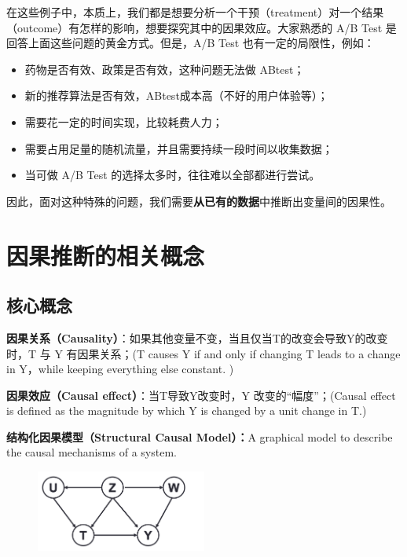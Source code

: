 \documentclass[12pt]{article}
\begin{document}
在这些例子中，本质上，我们都是想要分析一个干预（treatment）对一个结果（outcome）有怎样的影响，想要探究其中的因果效应。大家熟悉的 A/B Test 是回答上面这些问题的黄金方式。但是，A/B Test 也有一定的局限性，例如：
\begin{itemize}
\setlength{\itemsep}{0pt}
\setlength{\parsep}{0pt}
\setlength{\parskip}{0pt}
    \item 药物是否有效、政策是否有效，这种问题无法做 ABtest；
    \item 新的推荐算法是否有效，ABtest成本高（不好的用户体验等）；
    \item 需要花一定的时间实现，比较耗费人力；
    \item 需要占用足量的随机流量，并且需要持续一段时间以收集数据；
    \item 当可做 A/B Test 的选择太多时，往往难以全部都进行尝试。
\end{itemize}

因此，面对这种特殊的问题，我们需要\textbf{从已有的数据}中推断出变量间的因果性。

\section{因果推断的相关概念}
\subsection{核心概念}
\textbf{因果关系（Causality）}：如果其他变量不变，当且仅当T的改变会导致Y的改变时，T 与 Y 有因果关系；(T causes Y if and only if changing T leads to a change in Y，while keeping everything else constant. )\cite{Causal_Inference_and_Stable_Learning}

\textbf{因果效应（Causal effect）}：当T导致Y改变时，Y 改变的“幅度”；(Causal effect is defined as the magnitude by which Y is changed by a unit change in T.)

\textbf{结构化因果模型（Structural Causal Model）：}A graphical model to describe the causal mechanisms of a system.
\begin{figure}[H]
    \centering
    \includegraphics[width=0.5\textwidth]{fig/Causal_Inference_and_Stable_Learning-Causal-Model.png}
\end{figure}
\end{document}
